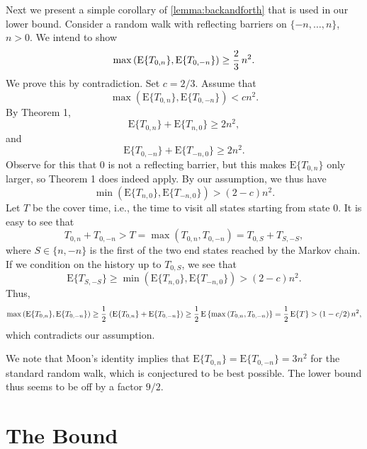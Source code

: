 \documentclass [letterpaper] {patmorin}
\newcommand{\EXP}{\mathrm{E}}
\begin{document}
Next we present a simple corollary of \ref{lemma:backandforth} that is used in our lower bound.
Consider a random walk with reflecting barriers on $\{ -n, \ldots, n \}$, $n > 0$.
We intend to show
\[
\max \left( \EXP \{ T_{0,n} \} , \EXP \{ T_{0,-n} \} \right)
 \ge  {2 \over 3} \, n^2.
\]
We prove this by contradiction. Set $c = 2/3$. Assume that
\[
\max \left( \EXP \{ T_{0,n} \} , \EXP \{ T_{0,-n} \} \right) <  cn^2.
\]
By Theorem 1,
\[
 \EXP \{ T_{0,n} \}  +  \EXP \{ T_{n,0} \}  \ge 2n^2,
\]
and
\[
 \EXP \{ T_{0,-n} \}  +  \EXP \{ T_{-n,0} \}  \ge 2n^2.
\]
Observe for this that $0$ is not a reflecting barrier, but this makes 
$ \EXP \{ T_{0,n} \}$ only larger, so Theorem 1 does indeed apply.
By our assumption, we thus have
\[
\min \left( \EXP \{ T_{n,0} \} ,  \EXP \{ T_{-n,0} \} \right) >  (2-c) n^2.
\]
Let $T$ be the cover time, i.e., the time to visit all states starting from state $0$. It is easy to see that
\[
T_{0,n} + T_{0,-n} > T = \max \left( T_{0,n} , T_{0,-n} \right)
  =  T_{0,S} + T_{S,-S},
\]
where $S \in \{ n, -n \}$ is the first of the two end states
reached by the Markov chain. If we condition on the history up to $T_{0,S}$,
we see that
\[
\EXP \{ T_{S,-S} \} \ge \min \left( \EXP \{ T_{n,0} \} ,  \EXP \{ T_{-n,0} \} \right) >  (2-c) n^2.
\]
Thus,
\[
\max \left( \EXP \{ T_{0,n} \} , \EXP \{ T_{0,-n} \} \right)
 \ge {1 \over 2} \, \left( \EXP \{ T_{0,n} \} + \EXP \{ T_{0,-n} \} \right)
 \ge {1 \over 2} \, \EXP \left\{ \max \left( T_{0,n} , T_{0,-n} \right) \right\} 
= {1 \over 2} \, \EXP \{ T \}
>  (1- c/2 ) \,  n^2 ,
\]
which contradicts our assumption.


We note that Moon's identity implies that $\EXP \{ T_{0,n} \} = \EXP \{ T_{0,-n} \} = 3n^2$
for the standard random walk, which is conjectured to be best possible.
	The lower bound thus seems to be off by a factor $9/2$.




\section{The Bound}
\label{sec:bound}
\end{document}
